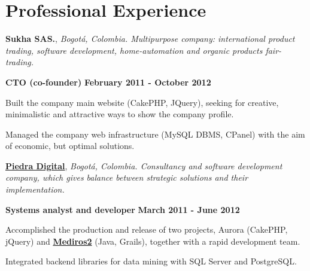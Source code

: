 \section{Professional Experience}
%
\textbf{Sukha SAS.}, \textit{Bogot\'a, Colombia.
Multipurpose company:
international product trading, software development, home-automation and organic
products fair-trading.}
\begin{outerlist}
\item[] \textbf{CTO (co-founder)} \hfill \textbf{February 2011 - October
2012}
    \begin{innerlist}
\item Built the company main website (CakePHP, JQuery), seeking for creative,
minimalistic and attractive ways to show the company profile.
\item Managed the company web infrastructure (MySQL DBMS, CPanel) with the
aim of economic, but optimal solutions.
    \end{innerlist}
\end{outerlist}

\quarterblankline

\href{http://www.piedradigital.com/}{\textbf{Piedra Digital}},
\textit{Bogot\'a, Colombia. Consultancy and software development
company, which gives balance between strategic solutions and their implementation.}
\begin{outerlist}
\item[] \textbf{Systems analyst and developer} \hfill \textbf{March 2011 - June
2012}
    \begin{innerlist}
\item Accomplished the production and release of
two projects, Aurora (CakePHP, jQuery) and
\href{http://demo.100grados.co:8080/desempeno100/}{\textbf{Mediros2}} (Java,
Grails), together with a rapid development team.
\item Integrated backend libraries for data mining with SQL Server and
PostgreSQL.
    \end{innerlist}
\end{outerlist}

\quarterblankline




